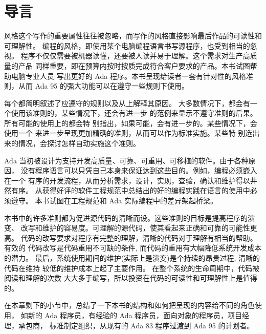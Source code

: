 %
%
%

\chapter{导言}
\label{c:introduction}
\pagestyle{fancy}

风格这个写作的重要属性往往被忽略，而写作的风格直接影响最后作品的可读性和
可理解性。 编程的风格，即使用某个电脑编程语言书写源程序，也受到相当的忽视。
程序不仅仅需要被机器读懂，还要被人读并易于理解。这个需求对生产高质量的产品
同样重要，即在预算内按时按质完成符合客户要求的产品。本书试图帮助电脑专业人员
写出更好的 Ada 程序。本书呈现给读者一套有针对性的风格准则，从而 Ada 95 
\cite{arm95}的强大功能可以在遵守一些规则下使用。

每个都简明叙述了应遵守的规则以及从上解释其原因。
大多数情况下，都会有一个使用该准则的，某些情况下，还会有进一步
的范例来显示不遵守准则的后果。所有可能的使用上的都会特
别指出，如果可能，会有进一步的。某些情况下，会使用一个
来进一步呈现更加精确的准则，从而可以作为标准实施。某些特
别选出来的情况，会探讨怎样自动实施这个准则。

Ada 当初被设计为支持开发高质量、可靠、可重用、可移植的软件。由于各种原因，
没有程序语言可以只凭自己本身来保证达到这些目的。例如，编程必须嵌入在一个
有序的开发流程，从而分析需求，设计，实现，查验，确认和维护得以井然有序。
从获得好评的软件工程规范中总结出的好的编程实践在语言的使用中必须遵守。
本书试图在工程规范和 Ada 实际编程中的差异架起桥梁。

本书中的许多准则都为促进源代码的清晰而设。这些准则的目标是提高程序的演变、
改写和维护的容易度。可理解的源代码，使其看起来正确和可靠的可能性更高。
代码的改写要求对程序有完整的理解，清晰的代码对于理解有相当的帮助。有效的
代码改写是代码重用不可缺的条件, 而代码的重用有大幅降低系统开发成本的潜力。
最后，系统使用期间的维护(实际上是演变)是个持续的昂贵过程, 清晰的代码在维持
较低的维护成本上起了主要作用。 在整个系统的生命周期中，代码被阅读和理解的次数
大大多于编写，所以投资在代码的可读性和可理解性上是值得的。

在本章剩下的小节中，总结了一下本书的结构和如何把呈现的内容给不同的角色使用，
如新的 Ada 程序员，有经验的 Ada 程序员，面向对象的程序员，项目经理，承包商，
标准制定组织，从现有的 Ada 83\cite{arm83} 程序过渡到 Ada 95 的计划者。
 
